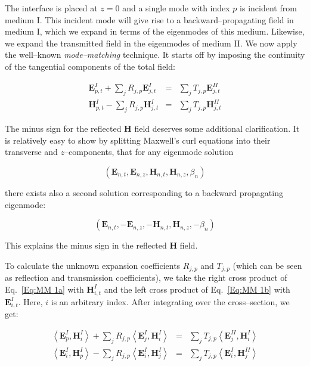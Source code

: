 The interface is placed at $z=0$ and a single mode with index $p$ is incident
from medium I. This incident mode will give rise to a backward--propagating field
in medium I, which we expand in terms of the eigenmodes of this medium. Likewise,
we expand the transmitted field in the eigenmodes of medium II. We now apply the well--known \emph{mode--matching} technique. It starts off by imposing the continuity of the tangential components of the
total field: 

\begin{eqnarray}
\mathbf{E}^{I}_{p,t}+\sum _{j}R_{j,p}\mathbf{E}^{I}_{j,t} & = & \sum _{j}T_{j,p}\mathbf{E}^{II}_{j,t}\label{Eq:MM 1a} \\
\mathbf{H}^{I}_{p,t}-\sum _{j}R_{j,p}\mathbf{H}^{I}_{j,t} & = & \sum _{j}T_{j,p}\mathbf{H}^{II}_{j,t}\label{Eq:MM 1b} 
\end{eqnarray}

The minus sign for the reflected ${\mathbf H}$ field deserves some additional clarification. It is relatively easy to show by splitting Maxwell's curl equations into their transverse and $z$--components, that for any eigenmode solution 

\begin{equation}
\label{Eq:eigen fw}
\left( \mathbf{E}_{n,t},\mathbf{E}_{n,z},\mathbf{H}_{n,t},\mathbf{H}_{n,z},\beta _{n}\right) 
\end{equation}

there exists also a second solution corresponding to a backward propagating eigenmode:

\begin{equation}
\label{Eq:eigen bw}
\left( \mathbf{E}_{n,t},-\mathbf{E}_{n,z},-\mathbf{H}_{n,t},\mathbf{H}_{n,z},-\beta _{n}\right) 
\end{equation}

This explains the minus sign in the reflected ${\mathbf H}$ field.

To calculate the unknown expansion coefficients $R_{j,p}$ and $T_{j,p}$
(which can be seen as reflection and transmission coefficients), we take the
right cross product of Eq.~\ref{Eq:MM 1a} with $\mathbf{H}^{I}_{i,t}$
and the left cross product of Eq.~\ref{Eq:MM 1b} with $\mathbf{E}^{I}_{i,t}$.
Here, $i$ is an arbitrary index. After integrating over the cross--section,
we get:

\begin{eqnarray}
\left\langle \mathbf{E}^{I}_{p},\mathbf{H}^{I}_{i}\right\rangle +\sum _{j}R_{j,p}\left\langle \mathbf{E}^{I}_{j},\mathbf{H}^{I}_{i}\right\rangle  & = & \sum _{j}T_{j,p}\left\langle \mathbf{E}^{II}_{j},\mathbf{H}^{I}_{i}\right\rangle \label{Eq:MM 2a} \\
\left\langle \mathbf{E}^{I}_{i},\mathbf{H}^{I}_{p}\right\rangle -\sum _{j}R_{j,p}\left\langle \mathbf{E}^{I}_{i},\mathbf{H}^{I}_{j}\right\rangle  & = & \sum _{j}T_{j,p}\left\langle \mathbf{E}^{I}_{i},\mathbf{H}^{II}_{j}\right\rangle \label{Eq:MM 2b} 
\end{eqnarray}

